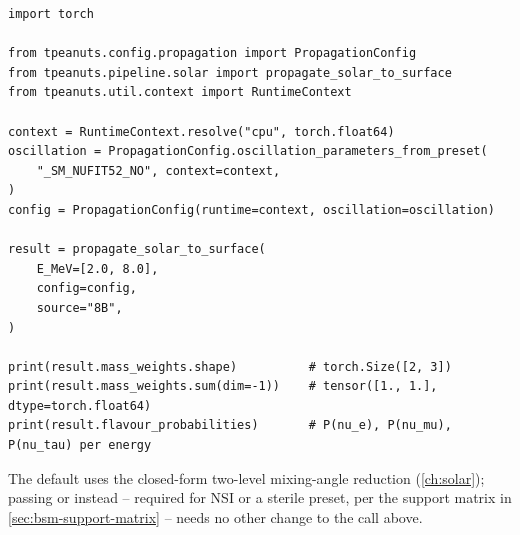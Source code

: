 \begin{examplebox}[title={Solar mass mixture at two energies, boron-8 source}]
\begin{lstlisting}[style=tpython]
import torch

from tpeanuts.config.propagation import PropagationConfig
from tpeanuts.pipeline.solar import propagate_solar_to_surface
from tpeanuts.util.context import RuntimeContext

context = RuntimeContext.resolve("cpu", torch.float64)
oscillation = PropagationConfig.oscillation_parameters_from_preset(
    "_SM_NUFIT52_NO", context=context,
)
config = PropagationConfig(runtime=context, oscillation=oscillation)

result = propagate_solar_to_surface(
    E_MeV=[2.0, 8.0],
    config=config,
    source="8B",
)

print(result.mass_weights.shape)          # torch.Size([2, 3])
print(result.mass_weights.sum(dim=-1))    # tensor([1., 1.], dtype=torch.float64)
print(result.flavour_probabilities)       # P(nu_e), P(nu_mu), P(nu_tau) per energy
\end{lstlisting}
\end{examplebox}

The default  uses the closed-form
two-level mixing-angle reduction (\cref{ch:solar}); passing
 or  instead --
required for NSI or a sterile  preset, per the support
matrix in \cref{sec:bsm-support-matrix} -- needs no other change to the
call above.
